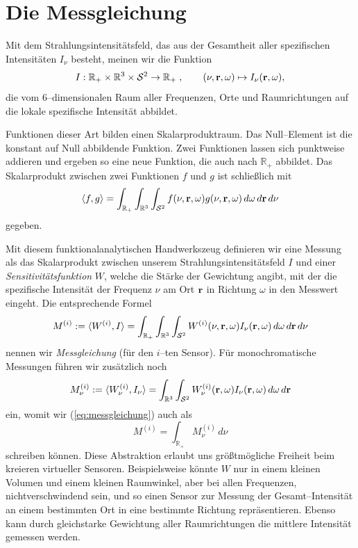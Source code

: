 	
	\section{Die Messgleichung}\label{sec:measurement_equation}
	Mit dem Strahlungsintensitätsfeld, das aus der Gesamtheit aller spezifischen Intensitäten $I_\nu$ besteht, meinen wir die Funktion
	$$I:\mathbb{R}_+\times\mathbb{R}^3\times\mathcal{S}^2\to\mathbb{R}_+\;,\qquad (\nu,\mathbf{r},\omega)\mapsto I_\nu(\mathbf{r},\omega),$$
	die vom 6--dimensionalen Raum aller Frequenzen, Orte und Raumrichtungen auf die lokale spezifische Intensität abbildet.
	
	Funktionen dieser Art bilden einen Skalarproduktraum. Das Null--Element ist die konstant auf Null abbildende Funktion. Zwei Funktionen lassen sich punktweise addieren und ergeben so eine neue Funktion, die auch nach $\mathbb{R}_+$ abbildet. Das Skalarprodukt zwischen zwei Funktionen $f$ und $g$ ist schließlich mit
	$$\langle f,g\rangle=\int_{\mathbb{R}_+} \int_{\mathbb{R}^3} \int_{\mathcal{S}^2} f(\nu,\mathbf{r},\omega)g(\nu,\mathbf{r},\omega)\,d\omega\,d\mathbf{r}\,d\nu$$
	gegeben.
	
	Mit diesem funktionalanalytischen Handwerkszeug definieren wir eine Messung als das Skalarprodukt zwischen unserem Strahlungsintensitätsfeld $I$ und einer {\em Sensitivitätsfunktion} $W$, welche die Stärke der Gewichtung angibt, mit der die spezifische Intensität der Frequenz $\nu$ am Ort $\mathbf{r}$ in Richtung $\omega$ in den Messwert eingeht. Die entsprechende Formel
	\begin{equation}\label{eq:messgleichung}
		M^{(i)}:=\langle W^{(i)},I\rangle=\int_{\mathbb{R}_+} \int_{\mathbb{R}^3} \int_{\mathcal{S}^2} W^{(i)}(\nu,\mathbf{r},\omega)I_\nu(\mathbf{r},\omega)\,d\omega\,d\mathbf{r}\,d\nu
	\end{equation}
	nennen wir {\em Messgleichung} (für den $i$--ten Sensor). Für monochromatische Messungen führen wir zusätzlich noch 
	\begin{equation}\label{eq:messgleichung_mono}
		M_\nu^{(i)}:=\langle W_\nu^{(i)},I_\nu\rangle=\int_{\mathbb{R}^3} \int_{\mathcal{S}^2} W_\nu^{(i)}(\mathbf{r},\omega)I_\nu(\mathbf{r},\omega)\,d\omega\,d\mathbf{r}
	\end{equation}
	ein, womit wir (\ref{eq:messgleichung}) auch als
	\begin{equation}\label{eq:messgleichung_frommonos}
		M^{(i)}=\int_{\mathbb{R}_+} M_\nu^{(i)}\,d\nu
	\end{equation}
	schreiben können.
	Diese Abstraktion erlaubt uns größtmögliche Freiheit beim kreieren virtueller Sensoren. Beispielsweise könnte $W$ nur in einem kleinen Volumen und einem kleinen Raumwinkel, aber bei allen Frequenzen, nichtverschwindend sein, und so einen Sensor zur Messung der Gesamt--Intensität an einem bestimmten Ort in eine bestimmte Richtung repräsentieren. Ebenso kann durch gleichstarke Gewichtung aller Raumrichtungen die mittlere Intensität gemessen werden.
	
